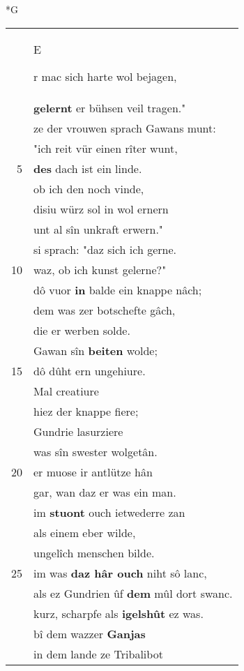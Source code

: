 \documentclass[8pt,a4paper,notitlepage]{article}
\begin{document}
\begin{table}[ht]
\begin{minipage}[t]{0.5\linewidth}
\small
\begin{center}*G
\end{center}
\begin{tabular}{rl}
 & \begin{large}E\end{large}r mac sich harte wol bejagen,\\ 
 & \textbf{gelernt} er bühsen veil tragen."\\ 
 & ze der vrouwen sprach Gawans munt:\\ 
 & "ich reit vür einen rîter wunt,\\ 
5 & \textbf{des} dach ist ein linde.\\ 
 & ob ich den noch vinde,\\ 
 & disiu würz sol in wol ernern\\ 
 & unt al sîn unkraft erwern."\\ 
 & si sprach: "daz sich ich gerne.\\ 
10 & waz, ob ich kunst gelerne?"\\ 
 & dô vuor \textbf{in} balde ein knappe nâch;\\ 
 & dem was zer botschefte gâch,\\ 
 & die er werben solde.\\ 
 & Gawan sîn \textbf{beiten} wolde;\\ 
15 & dô dûht ern ungehiure.\\ 
 & Mal creatiure\\ 
 & hiez der knappe fiere;\\ 
 & Gundrie lasurziere\\ 
 & was sîn swester wolgetân.\\ 
20 & er muose ir antlütze hân\\ 
 & gar, wan daz er was ein man.\\ 
 & im \textbf{stuont} ouch ietwederre zan\\ 
 & als einem eber wilde,\\ 
 & ungelîch menschen bilde.\\ 
25 & im was \textbf{daz hâr ouch} niht sô lanc,\\ 
 & als ez Gundrien ûf \textbf{dem} mûl dort swanc.\\ 
 & kurz, scharpfe als \textbf{igelshût} ez was.\\ 
 & bî dem wazzer \textbf{Ganjas}\\ 
 & in dem lande ze Tribalibot\\ 

\end{tabular}
\end{minipage}
\end{table}
\end{document}
